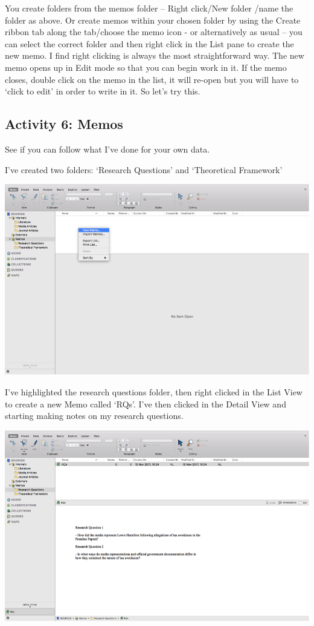\documentclass[]{book}
\theoremstyle{definition}
\theoremstyle{definition}
\theoremstyle{definition}
\theoremstyle{remark}
\begin{document}
You create folders from the memos folder -- Right click/New folder /name
the folder as above. Or create memos within your chosen folder by using
the Create ribbon tab along the tab/choose the memo icon - or
alternatively as usual -- you can select the correct folder and then
right click in the List pane to create the new memo. I find right
clicking is always the most straightforward way. The new memo opens up
in Edit mode so that you can begin work in it. If the memo closes,
double click on the memo in the list, it will re-open but you will have
to `click to edit' in order to write in it. So let's try this.

\hypertarget{activity-6-memos}{%
\subsection{Activity 6: Memos}\label{activity-6-memos}}

See if you can follow what I've done for your own data.

I've created two folders: `Research Questions' and `Theoretical
Framework'

\includegraphics{imgs/qual_18.png}

I've highlighted the research questions folder, then right clicked in
the List View to create a new Memo called `RQs'. I've then clicked in
the Detail View and starting making notes on my research questions.

\includegraphics{imgs/qual_19.png}
\end{document}
